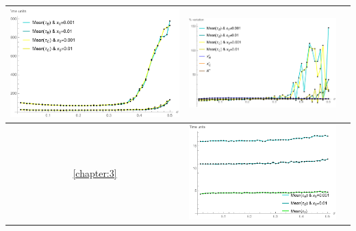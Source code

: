 \begin{table}[!htb]
\begin{tabular}{c|c|c}
\begin{minipage}{.45\textwidth}
			\includegraphics[width=\linewidth]{StopTime/2_meantau1.pdf}
		\end{minipage}
		& \begin{minipage}{.45\textwidth}
			\includegraphics[width=\linewidth]{StopTime/2_varSP500H1500.pdf}
		\end{minipage}
		 \\ \hline
		\ref{chapter:3} & \begin{minipage}{.45\textwidth}
			\includegraphics[width=\linewidth]{StopTime/3_meantau1.pdf}

\end{minipage}
\end{tabular}
\end{table}
